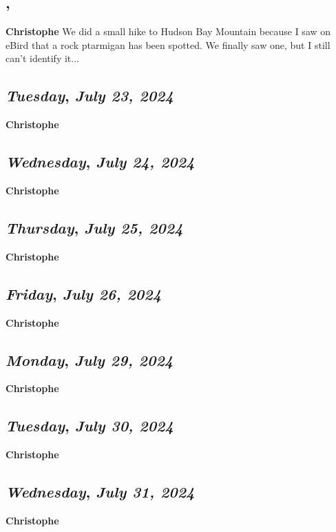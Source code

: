 \subsection*{\weekday, \day}
\textbf {Christophe}
We did a small hike to Hudson Bay Mountain because I saw on eBird that a rock ptarmigan has been spotted. We finally saw one,  but I still can't identify it...
\def\day{\textit{July 23, 2024}}
\def\weekday{\textit{Tuesday}}
\subsection*{\weekday, \day}
\textbf {Christophe}

\def\day{\textit{July 24, 2024}}
\def\weekday{\textit{Wednesday}}
\subsection*{\weekday, \day}
\textbf {Christophe}

\def\day{\textit{July 25, 2024}}
\def\weekday{\textit{Thursday}}
\subsection*{\weekday, \day}
\textbf {Christophe}

\def\day{\textit{July 26, 2024}}
\def\weekday{\textit{Friday}}
\subsection*{\weekday, \day}
\textbf {Christophe}



\def\day{\textit{July 29, 2024}}
\def\weekday{\textit{Monday}}
\subsection*{\weekday, \day}
\textbf {Christophe}

\def\day{\textit{July 30, 2024}}
\def\weekday{\textit{Tuesday}}
\subsection*{\weekday, \day}
\textbf {Christophe}

\def\day{\textit{July 31, 2024}}
\def\weekday{\textit{Wednesday}}
\subsection*{\weekday, \day}
\textbf {Christophe}

